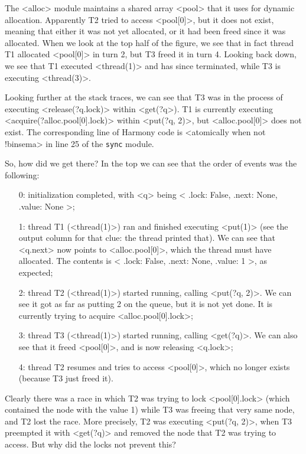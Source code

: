 \documentclass{report}
\begin{document}
The <{alloc}> module maintains a shared array <{pool}> that
it uses for dynamic allocation.  Apparently T2 tried to access
<{pool[0]}>, but it does not exist, meaning that either it was not
yet allocated, or it had been freed since it was allocated.
When we look at the top half of the figure, we see that in fact thread
T1 allocated <{pool[0]}> in turn 2, but T3 freed it in turn 4.
Looking back down, we see that T1 executed <{thread(1)}> and has
since terminated, while T3 is executing <{thread(3)}>.

Looking further at the stack traces, we can see that
T3 was in the process of executing
<{release(?q.lock)}> within <{get(?q}>).
T1 is currently executing <{acquire(?alloc.pool[0].lock)}>
within <{put(?q, 2)}>, but 
<{alloc.pool[0]}> does not exist.
The corresponding line of Harmony code is
<{atomically when not !binsema}>
in line 25 of the \texttt{sync} module.

So, how did we get there?  In the top we can see that the order of
events was the following:
\begin{enumerate}
\item[0:] initialization completed, with <{q}> being
<{{ .lock: False, .next: None, .value: None }}>;
\item[1:] thread T1 (<{thread(1)}>) ran and finished executing
<{put(1)}> (see the output column for that clue: the thread printed that).
We can see that <{q.next}> now points to <{alloc.pool[0]}>,
which the thread must have allocated.  The contents is 
<{{ .lock: False, .next: None, .value: 1 }}>, as expected;
\item[2:] thread T2 (<{thread(1)}>) started running, calling
<{put(?q, 2)}>.  We can see it got as far as putting 2 on the queue,
but it is not yet done.  It is currently trying to acquire
<{alloc.pool[0].lock}>;
\item[3:] thread T3 (<{thread(1)}>) started running, calling
<{get(?q)}>.  We can also see that it freed <{pool[0]}>,
and is now releasing <{q.lock}>;
\item[4:] thread T2 resumes and tries to access <{pool[0]}>, which
no longer exists (because T3 just freed it).
\end{enumerate}

Clearly there was a race in which T2 was trying to lock
<{pool[0].lock}> (which contained the node with the value 1)
while T3 was freeing that very same node, and T2 lost the race.
More precisely, T2 was executing <{put(?q, 2)}>, when T3
preempted it with <{get(?q)}> and removed the node that T2
was trying to access.  But why did the locks not prevent this?
\end{document}
